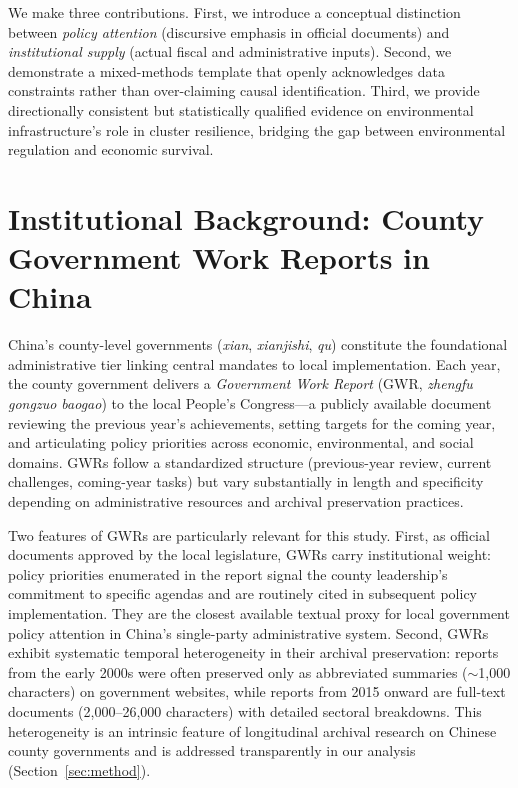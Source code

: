 \documentclass[a4paper, twoside, final]{article}
\begin{document}
We make three contributions. First, we introduce a conceptual distinction between \emph{policy attention} (discursive emphasis in official documents) and \emph{institutional supply} (actual fiscal and administrative inputs). Second, we demonstrate a mixed-methods template that openly acknowledges data constraints rather than over-claiming causal identification. Third, we provide directionally consistent but statistically qualified evidence on environmental infrastructure's role in cluster resilience, bridging the gap between environmental regulation and economic survival.

\section{Institutional Background: County Government Work Reports in China}\label{sec:background}

China's county-level governments (\emph{xian}, \emph{xianjishi}, \emph{qu}) constitute the foundational administrative tier linking central mandates to local implementation. Each year, the county government delivers a \emph{Government Work Report} (GWR, \textit{zhengfu gongzuo baogao}) to the local People's Congress---a publicly available document reviewing the previous year's achievements, setting targets for the coming year, and articulating policy priorities across economic, environmental, and social domains. GWRs follow a standardized structure (previous-year review, current challenges, coming-year tasks) but vary substantially in length and specificity depending on administrative resources and archival preservation practices.

Two features of GWRs are particularly relevant for this study. First, as official documents approved by the local legislature, GWRs carry institutional weight: policy priorities enumerated in the report signal the county leadership's commitment to specific agendas and are routinely cited in subsequent policy implementation. They are the closest available textual proxy for local government policy attention in China's single-party administrative system. Second, GWRs exhibit systematic temporal heterogeneity in their archival preservation: reports from the early 2000s were often preserved only as abbreviated summaries ($\sim$1,000 characters) on government websites, while reports from 2015 onward are full-text documents (2,000--26,000 characters) with detailed sectoral breakdowns. This heterogeneity is an intrinsic feature of longitudinal archival research on Chinese county governments and is addressed transparently in our analysis (Section~\ref{sec:method}).
\end{document}
